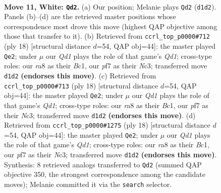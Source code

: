\documentclass[11pt]{article}
\begin{document}
\clearpage

\begin{figure}[p]\centering
\begin{subfigure}{0.46\textwidth}\centering
\resizebox{\linewidth}{!}{%
\newchessgame
\chessboard[
  setfen={rnbq1rk1/pp3pp1/4pn2/7p/2BP4/2P2N2/P4PPP/R1BQ1RK1 w - - 0 11},
  showmover=false,
  pgfstyle=straightmove, color=movearrow, markmove={d1-d2}
]}
\caption{}
\end{subfigure}\hfill
\begin{subfigure}{0.46\textwidth}\centering
\resizebox{\linewidth}{!}{%
\newchessgame
\chessboard[
  setfen={rnbq1rk1/p4ppp/1p2pn2/8/1bBP4/2N2N2/PP3PPP/R1BQ1RK1 w - - 0 10},
  showmover=false,
  pgfstyle=straightmove, color=movearrow, markmove={d1-e2}
]}
\caption{}
\end{subfigure}
\\[4pt]
\begin{subfigure}{0.46\textwidth}\centering
\resizebox{\linewidth}{!}{%
\newchessgame
\chessboard[
  setfen={rnbq1rk1/p4ppp/1p2pn2/8/1bBP4/2N2N2/PP3PPP/R1BQ1RK1 w - - 0 10},
  showmover=false,
  pgfstyle=straightmove, color=movearrow, markmove={d1-e2}
]}
\caption{}
\end{subfigure}\hfill
\begin{subfigure}{0.46\textwidth}\centering
\resizebox{\linewidth}{!}{%
\newchessgame
\chessboard[
  setfen={rnbq1rk1/p4ppp/1p2pn2/8/1bBP4/2N2N2/PP3PPP/R1BQ1RK1 w - - 0 10},
  showmover=false,
  pgfstyle=straightmove, color=movearrow, markmove={d1-e2}
]}
\caption{}
\end{subfigure}
\caption{\textbf{Move 11, White: \texttt{Qd2}.} (a) Our position; Melanie plays \texttt{Qd2} (\texttt{d1d2}). Panels (b)--(d) are the retrieved master positions whose correspondence most drove this move (highest QAP objective among those that transfer to it). (b) Retrieved from \texttt{ccrl\_top\_p0000\#712} (ply 18) [structural distance $d$=54, QAP obj=44]: the master played \texttt{Qe2}; under $\mu$ our \emph{Qd1} plays the role of that game's \emph{Qd1}; cross-type roles: our \emph{r}a8 as their \emph{B}c1, our \emph{p}f7 as their \emph{N}c3; transferred move \texttt{d1d2} \textbf{(endorses this move)}. (c) Retrieved from \texttt{ccrl\_top\_p0000\#713} (ply 18) [structural distance $d$=54, QAP obj=44]: the master played \texttt{Qe2}; under $\mu$ our \emph{Qd1} plays the role of that game's \emph{Qd1}; cross-type roles: our \emph{r}a8 as their \emph{B}c1, our \emph{p}f7 as their \emph{N}c3; transferred move \texttt{d1d2} \textbf{(endorses this move)}. (d) Retrieved from \texttt{ccrl\_top\_p0000\#1275} (ply 18) [structural distance $d$=54, QAP obj=44]: the master played \texttt{Qe2}; under $\mu$ our \emph{Qd1} plays the role of that game's \emph{Qd1}; cross-type roles: our \emph{r}a8 as their \emph{B}c1, our \emph{p}f7 as their \emph{N}c3; transferred move \texttt{d1d2} \textbf{(endorses this move)}. Synthesis: 8 retrieved analogs transferred to \texttt{Qd2} (summed QAP objective 350, the strongest correspondence among the candidate moves); Melanie committed it via the \texttt{search} selector.}
\label{fig:thought-m20}
\end{figure}
\end{document}
